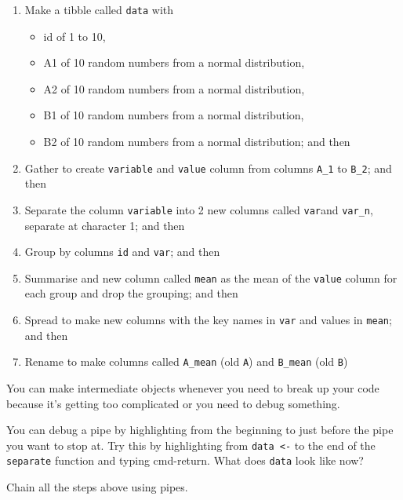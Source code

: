 \documentclass[
  oneside]{book}
\providecommand{\tightlist}{%
  \setlength{\itemsep}{0pt}\setlength{\parskip}{0pt}}
\begin{document}
\begin{enumerate}
\def\labelenumi{\arabic{enumi}.}
\tightlist
\item
  Make a tibble called \texttt{data} with

  \begin{itemize}
  \tightlist
  \item
    id of 1 to 10,
  \item
    A1 of 10 random numbers from a normal distribution,
  \item
    A2 of 10 random numbers from a normal distribution,
  \item
    B1 of 10 random numbers from a normal distribution,
  \item
    B2 of 10 random numbers from a normal distribution; and then
  \end{itemize}
\item
  Gather to create \texttt{variable} and \texttt{value} column from columns \texttt{A\_1} to \texttt{B\_2}; and then
\item
  Separate the column \texttt{variable} into 2 new columns called \texttt{var}and \texttt{var\_n}, separate at character 1; and then
\item
  Group by columns \texttt{id} and \texttt{var}; and then
\item
  Summarise and new column called \texttt{mean} as the mean of the \texttt{value} column for each group and drop the grouping; and then
\item
  Spread to make new columns with the key names in \texttt{var} and values in \texttt{mean}; and then
\item
  Rename to make columns called \texttt{A\_mean} (old \texttt{A}) and \texttt{B\_mean} (old \texttt{B})
\end{enumerate}

You can make intermediate objects whenever you need to break up your code because it's getting too complicated or you need to debug something.

\begin{info}
You can debug a pipe by highlighting from the beginning to just before the pipe you want to stop at. Try this by highlighting from \texttt{data\ \textless{}-} to the end of the \texttt{separate} function and typing cmd-return. What does \texttt{data} look like now?

\end{info}

Chain all the steps above using pipes.
\end{document}
